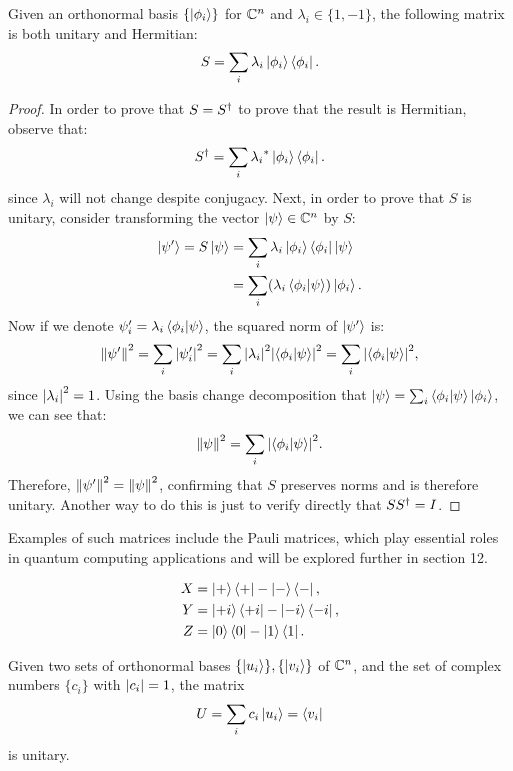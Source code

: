 \documentclass[12pt]{article}
\begin{document}
\begin{theorem}
    Given an orthonormal basis $\{\ket{\phi_i}\}$ for $\mathbb{C}^n$ and $\lambda_i \in \{1, -1\}$, the following matrix is both unitary and Hermitian:
    \[
    S = \sum_{i} \lambda_i \ket{\phi_i} \bra{\phi_i}.
    \]
\end{theorem}

\begin{proof}
    In order to prove that $S = {S}^{\dagger}$ to prove that the result is Hermitian, observe that:
    \[
    {S}^{\dagger} = \sum_{i} {\lambda_i}^* \ket{\phi_i} \bra{\phi_i}.
    \]
    since $\lambda_i$ will not change despite conjugacy. Next, in order to prove that $S$ is unitary, consider transforming the vector $\ket{\psi} \in \mathbb{C}^n$ by $S$:
    \begin{align*}
        \ket{\psi^\prime} = S \ketpsi &= \sum_{i} \lambda_i \ket{\phi_i} \bra{\phi_i}\ketpsi \\
        &= \sum_{i} (\lambda_i \braket{\phi_i}{\psi}) \ket{\phi_i}.
    \end{align*}
    Now if we denote $\psi_i^\prime = \lambda_i \braket{\phi_i}{\psi}$, the squared norm of $\ket{\psi^\prime}$ is:
    \[
    \norm{\psi^\prime}^2 = \sum_{i} \abs{\psi_i^\prime}^2 = \sum_{i} \abs{\lambda_i}^2 \abs{\braket{\phi_i}{\psi}}^2 = \sum_{i} \abs{\braket{\phi_i}{\psi}}^2,
    \]
    since $\abs{\lambda_i}^2 = 1$. Using the basis change decomposition that $\ket{\psi} = \sum_{i} \braket{\phi_i}{\psi} \ket{\phi_i}$, we can see that:
    \[
    \norm{\psi}^2 = \sum_{i} \abs{\braket{\phi_i}{\psi}}^2.
    \]
    Therefore, $\norm{\psi^\prime}^2 = \norm{\psi}^2$, confirming that $S$ preserves norms and is therefore unitary. Another way to do this is just to verify directly that $S {S}^{\dagger} = I$. 
\end{proof}

Examples of such matrices include the Pauli matrices, which play essential roles in quantum computing applications and will be explored further in section 12. 

\begin{align*}
X &= \ket{+}\bra{+} - \ket{-}\bra{-}, \\
Y &= \ket{+i}\bra{+i} - \ket{-i}\bra{-i}, \\
Z &= \ket{0}\bra{0} - \ket{1}\bra{1}.
\end{align*}

\begin{theorem}
    Given two sets of orthonormal bases $\{\ket{{u}_i}\}, \{\ket{{v}_i}\}$ of $\mathbb{C}^n$, and the set of complex numbers $\{c_i\}$ with $\abs{c_i} = 1$, the matrix
    \[
    U = \sum_{i} c_i \ket{u_i} = \bra{v_i}
    \]
    is unitary. 
\end{theorem}
\end{document}

